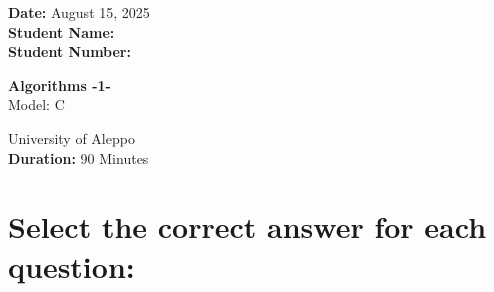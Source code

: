 \documentclass[12pt]{article}
\begin{document}
\begin{minipage}[t]{0.3\textwidth}
    \textbf{Date:} August 15, 2025\\[0.5em]
    \textbf{Student Name: }\\[0.5em]
    \textbf{Student Number: }
\end{minipage}
\begin{minipage}[t]{0.3\textwidth}
    \centering
    \Large\textbf{Algorithms -1-}\\[0.5em]
    \Large{Model:} C\\[0.5em]
\end{minipage}\hfill
\begin{minipage}[t]{0.3\textwidth}
    \raggedleft
    University of Aleppo\\[0.5em]
    \textbf{Duration: }90 Minutes

\end{minipage}

\vspace{1.5cm}

\section*{\small Select the correct answer for each question:}
\end{document}
